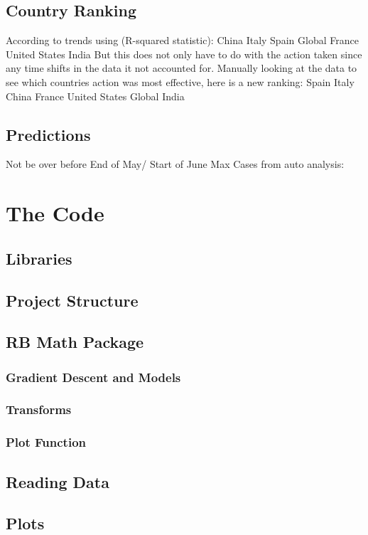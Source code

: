 \documentclass{report}
\begin{document}
        \subsection{Country Ranking}
            According to trends using (R-squared statistic):
            \newline
                China Italy Spain Global France United States India
            \newline
            But this does not only have to do with the action taken since any time shifts in the data it not accounted for. Manually looking at the data to see which countries action was most effective, here is a new ranking:
            \newline
            Spain Italy China France United States Global India
        \subsection{Predictions}
            Not be over before End of May/ Start of June
            \newline
            Max Cases from auto analysis:
    \section{The Code}
        \subsection{Libraries}
        \subsection{Project Structure}
        \subsection{RB Math Package}
            \subsubsection{Gradient Descent and Models}
            \subsubsection{Transforms}
            \subsubsection{Plot Function}
        \subsection{Reading Data}
        \subsection{Plots}
\end{document}
